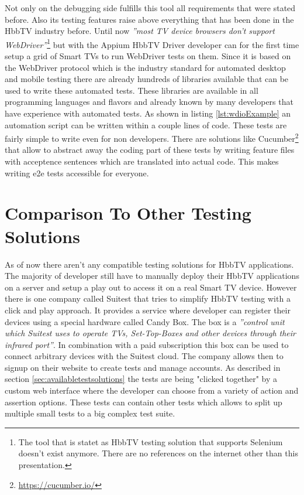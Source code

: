Not only on the debugging side fulfills this tool all requirements that were stated before. Also its testing
features raise above everything that has been done in the HbbTV industry before. Until now \textit{''most TV
device browsers don’t support WebDriver''}\cite{sengo}\footnote{The tool that is statet as HbbTV testing solution
that supports Selenium doesn't exist anymore. There are no references on the internet other than this presentation.}
but with the Appium HbbTV Driver developer can for the first time setup a grid of Smart TVs to run WebDriver
tests on them. Since it is based on the WebDriver protocol which is the industry standard for automated desktop
and mobile testing there are already hundreds of libraries available that can be used to write these automated tests.
These libraries are available in all programming languages and flavors and already known by many developers that
have experience with automated tests. As shown in listing \ref{lst:wdioExample} an automation script can be written
within a couple lines of code. These tests are fairly simple to write even for non developers. There are solutions like
Cucumber\footnote{\url{https://cucumber.io/}} that allow to abstract away the coding part of these tests by writing
feature files with acceptence sentences which are translated into actual code. This makes writing e2e tests accessible
for everyone.

\section{Comparison To Other Testing Solutions\label{sec:businessmodel}}

As of now there aren't any compatible testing solutions for HbbTV applications. The majority of developer still have
to manually deploy their HbbTV applications on a server and setup a play out to access it on a real Smart TV device.
However there is one company called Suitest that tries to simplify HbbTV testing with a click and play approach.
It provides a service where developer can register their devices using a special hardware called Candy Box. The box
is a \textit{''control unit which Suitest uses to operate TVs, Set-Top-Boxes and other devices through their infrared
port''}\cite{candybox}. In combination with a paid subscription this box can be used to connect arbitrary devices
with the Suitest cloud. The company allows then to signup on their website to create tests and manage accounts.
As described in section \ref{sec:availabletestsolutions} the tests are being "clicked together" by a custom web interface
where the developer can choose from a variety of action and assertion options. These tests can contain other tests
which allows to split up multiple small tests to a big complex test suite.


